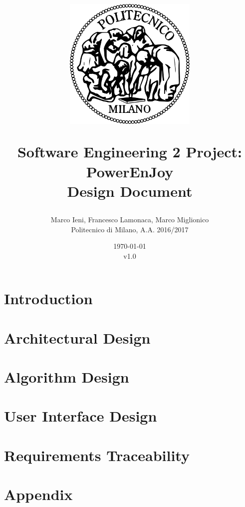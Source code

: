 \documentclass[a4paper, 12pt]{report}
\title{
	\begin{figure}[h]
		\centering
		\includegraphics{../common_resources/logo_polimi.png}
	\end{figure}
	\vspace{30px}
	Software Engineering 2 Project: PowerEnJoy \\ \vspace{1em}
	\textbf{D}esign \textbf{D}ocument
}
\author{Marco Ieni, Francesco Lamonaca, Marco Miglionico\\Politecnico di Milano, A.A. 2016/2017}
\date{\today\\v1.0}
\begin{document}
\maketitle
\tableofcontents

\chapter{Introduction}
\label{ch:introduction}






\chapter{Architectural Design}
\label{ch:architectural_design}









\chapter{Algorithm Design}
\label{ch:algorithm_design}


\chapter{User Interface Design}
\label{ch:ui_design}



\chapter{Requirements Traceability}
\label{ch:requirements_traceability}


\appendix
\chapter{Appendix}

\end{document}
